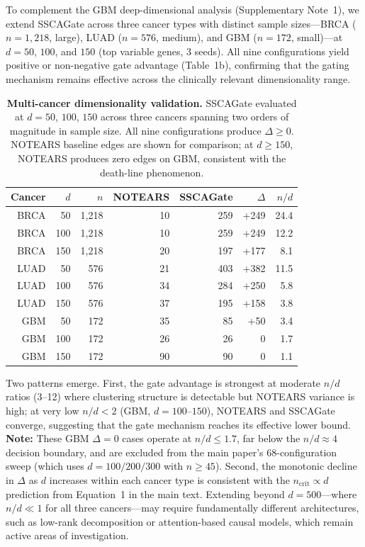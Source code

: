 \documentclass[12pt,a4paper]{article}
\begin{document}
To complement the GBM deep-dimensional analysis (Supplementary Note~1),
we extend SSCAGate across three cancer types with distinct sample sizes---BRCA
($n = 1{,}218$, large), LUAD ($n = 576$, medium), and GBM ($n = 172$, small)---at
$d = 50$, $100$, and $150$ (top variable genes, 3 seeds). All nine configurations
yield positive or non-negative gate advantage (Table~1b), confirming
that the gating mechanism remains effective across the clinically relevant
dimensionality range.

\begin{table}[htbp]
\centering
\caption{\textbf{Multi-cancer dimensionality validation.}
SSCAGate evaluated at $d = 50$, $100$, $150$ across three cancers spanning
two orders of magnitude in sample size. All nine configurations produce
$\Delta \geq 0$. NOTEARS baseline edges are shown for comparison; at $d \geq 150$,
NOTEARS produces zero edges on GBM, consistent with the death-line phenomenon.\label{tab:note1b}}
\begin{tabular}{rrrrrrr}
\toprule
Cancer & $d$ & $n$ & NOTEARS & SSCAGate & $\Delta$ & $n/d$ \\
\midrule
BRCA & 50  & 1,218 & 10  & 259  & +249 & 24.4 \\
BRCA & 100 & 1,218 & 10  & 259  & +249 & 12.2 \\
BRCA & 150 & 1,218 & 20  & 197  & +177 & 8.1 \\
LUAD & 50  & 576  & 21  & 403  & +382 & 11.5 \\
LUAD & 100 & 576  & 34  & 284  & +250 & 5.8 \\
LUAD & 150 & 576  & 37  & 195  & +158 & 3.8 \\
GBM  & 50  & 172  & 35  & 85   & +50  & 3.4 \\
GBM  & 100 & 172  & 26  & 26   & 0    & 1.7 \\
GBM  & 150 & 172  & 90  & 90   & 0    & 1.1 \\
\bottomrule
\end{tabular}
\end{table}

Two patterns emerge. First, the gate advantage is strongest at moderate $n/d$
ratios (3--12) where clustering structure is detectable but NOTEARS variance is
high; at very low $n/d < 2$ (GBM, $d = 100$--$150$), NOTEARS and SSCAGate converge,
suggesting that the gate mechanism reaches its effective lower bound.
\textbf{Note:} These GBM $\Delta=0$ cases operate at $n/d \leq 1.7$, far below
the $n/d \approx 4$ decision boundary, and are excluded from the main paper's
68-configuration sweep (which uses $d=100/200/300$ with $n \geq 45$).
Second, the
monotonic decline in $\Delta$ as $d$ increases within each cancer type is consistent
with the $n_{\text{crit}} \propto d$ prediction from Equation~1 in the main text.
Extending beyond $d = 500$---where $n/d \ll 1$ for all three cancers---may require
fundamentally different architectures, such as low-rank decomposition or
attention-based causal models, which remain active areas of investigation.
\end{document}

